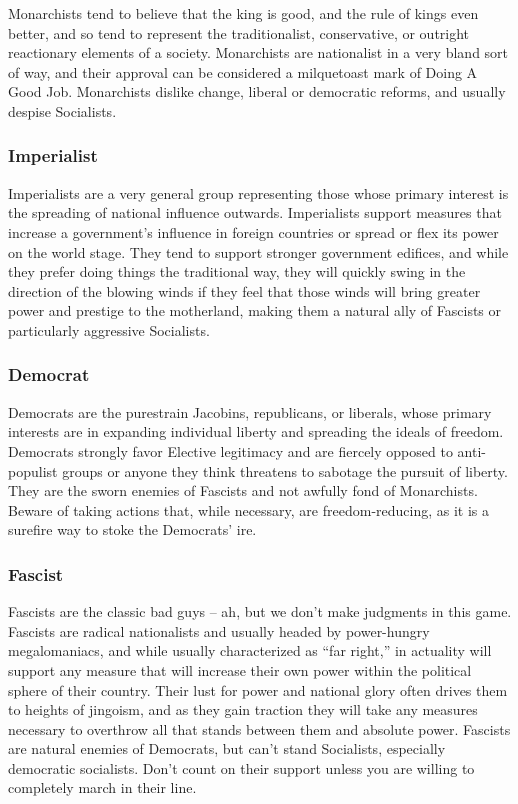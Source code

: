 \documentclass[11 pt]{scrartcl}
\begin{document}
Monarchists tend to believe that the king is good, and the rule of kings even better, and so tend to represent the traditionalist, conservative, or outright reactionary elements of a society. Monarchists are nationalist in a very bland sort of way, and their approval can be considered a milquetoast mark of Doing A Good Job. Monarchists dislike change, liberal or democratic reforms, and usually despise Socialists.

\subsubsection*{Imperialist}

Imperialists are a very general group representing those whose primary interest is the spreading of national influence outwards. Imperialists support measures that increase a government’s influence in foreign countries or spread or flex its power on the world stage. They tend to support stronger government edifices, and while they prefer doing things the traditional way, they will quickly swing in the direction of the blowing winds if they feel that those winds will bring greater power and prestige to the motherland, making them a natural ally of Fascists or particularly aggressive Socialists.

\subsubsection*{Democrat}

Democrats are the purestrain Jacobins, republicans, or liberals, whose primary interests are in expanding individual liberty and spreading the ideals of freedom. Democrats strongly favor Elective legitimacy and are fiercely opposed to anti-populist groups or anyone they think threatens to sabotage the pursuit of liberty. They are the sworn enemies of Fascists and not awfully fond of Monarchists. Beware of taking actions that, while necessary, are freedom-reducing, as it is a surefire way to stoke the Democrats' ire.

\subsubsection*{Fascist}

Fascists are the classic bad guys – ah, but we don’t make judgments in this game. Fascists are radical nationalists and usually headed by power-hungry megalomaniacs, and while usually characterized as “far right,” in actuality will support any measure that will increase their own power within the political sphere of their country. Their lust for power and national glory often drives them to heights of jingoism, and as they gain traction they will take any measures necessary to overthrow all that stands between them and absolute power. Fascists are natural enemies of Democrats, but can’t stand Socialists, especially democratic socialists. Don’t count on their support unless you are willing to completely march in their line.
\end{document}
